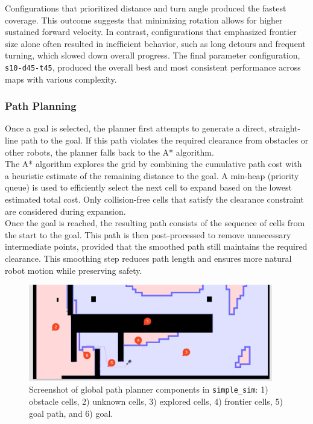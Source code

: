 Configurations that prioritized distance and turn angle produced the fastest coverage. This outcome suggests that minimizing rotation allows for higher sustained forward velocity. In contrast, configurations that emphasized frontier size alone often resulted in inefficient behavior, such as long detours and frequent turning, which slowed down overall progress. The final parameter configuration, \texttt{s10-d45-t45}, produced the overall best and most consistent performance across maps with various complexity.

\subsubsection{Path Planning}
\label{sec:path_planning}
Once a goal is selected, the planner first attempts to generate a direct, straight-line path to the goal. If this path violates the required clearance from obstacles or other robots, the planner falls back to the A* algorithm.\\

The A* algorithm explores the grid by combining the cumulative path cost with a heuristic estimate of the remaining distance to the goal. A min-heap (priority queue) is used to efficiently select the next cell to expand based on the lowest estimated total cost. Only collision-free cells that satisfy the clearance constraint are considered during expansion.\\

Once the goal is reached, the resulting path consists of the sequence of cells from the start to the goal. This path is then post-processed to remove unnecessary intermediate points, provided that the smoothed path still maintains the required clearance. This smoothing step reduces path length and ensures more natural robot motion while preserving safety.

\begin{figure}[H]
  \begin{center}
    \includegraphics[width=0.95\textwidth]{./figures/screenshots/path-planning-edit.png}
  \end{center}
  \caption{Screenshot of global path planner components in \texttt{simple\_sim}: 1) obstacle cells, 2) unknown cells, 3) explored cells, 4) frontier cells, 5) goal path, and 6) goal.}
  \label{fig:path_planning}
\end{figure}


